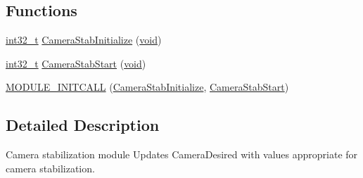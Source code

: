 \subsection*{Functions}
\begin{DoxyCompactItemize}
\item 
\hyperlink{group___n_a_m_e_gafd12020da5a235dfcf0c3c748fb5baed}{int32\-\_\-t} \hyperlink{group___camera_stab_ga8bb94b51a3ec12f84fe0597c845ddd12}{Camera\-Stab\-Initialize} (\hyperlink{group___n_a_m_e_ga18028b8badbf1ea7e704ccac3c488e82}{void})
\item 
\hyperlink{group___n_a_m_e_gafd12020da5a235dfcf0c3c748fb5baed}{int32\-\_\-t} \hyperlink{group___camera_stab_ga4869e8ea0ca41440b337709ea1e12709}{Camera\-Stab\-Start} (\hyperlink{group___n_a_m_e_ga18028b8badbf1ea7e704ccac3c488e82}{void})
\item 
\hyperlink{group___camera_stab_gac1275942f14da04844aa1ca1c0aac737}{M\-O\-D\-U\-L\-E\-\_\-\-I\-N\-I\-T\-C\-A\-L\-L} (\hyperlink{group___battery_module_ga8bb94b51a3ec12f84fe0597c845ddd12}{Camera\-Stab\-Initialize}, \hyperlink{group___camera_stab_ga4869e8ea0ca41440b337709ea1e12709}{Camera\-Stab\-Start})
\end{DoxyCompactItemize}


\subsection{Detailed Description}
Camera stabilization module Updates Camera\-Desired with values appropriate for camera stabilization. 

